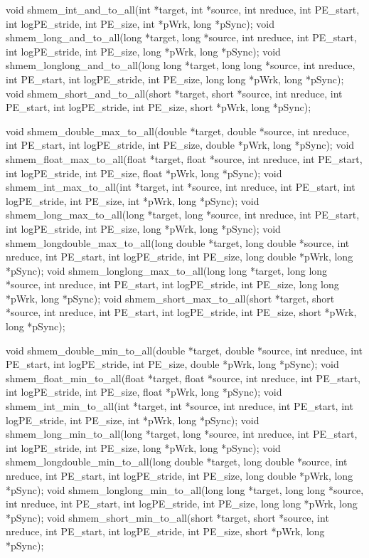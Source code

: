 
\synC %


void shmem_int_and_to_all(int *target, int *source, int nreduce, int PE_start, int logPE_stride, int PE_size, int *pWrk, long *pSync);
void shmem_long_and_to_all(long *target, long *source, int nreduce, int PE_start, int logPE_stride, int PE_size, long *pWrk, long *pSync);
void shmem_longlong_and_to_all(long long *target, long long *source, int nreduce, int PE_start, int logPE_stride, int PE_size, long long *pWrk, long *pSync);
void shmem_short_and_to_all(short *target, short *source, int nreduce, int PE_start, int logPE_stride, int PE_size, short *pWrk, long *pSync);


void shmem_double_max_to_all(double *target, double *source, int nreduce, int PE_start, int logPE_stride, int PE_size, double *pWrk, long *pSync);
void shmem_float_max_to_all(float *target, float *source, int nreduce, int PE_start, int logPE_stride, int PE_size, float *pWrk, long *pSync);
void shmem_int_max_to_all(int *target, int *source, int nreduce, int PE_start, int logPE_stride, int PE_size, int *pWrk, long *pSync);
void shmem_long_max_to_all(long *target, long *source, int nreduce, int PE_start, int logPE_stride, int PE_size, long *pWrk, long *pSync);
void shmem_longdouble_max_to_all(long double *target, long double *source, int nreduce, int PE_start, int logPE_stride, int PE_size, long double *pWrk, long *pSync);
void shmem_longlong_max_to_all(long long *target, long long *source, int nreduce, int PE_start, int logPE_stride, int PE_size, long long *pWrk, long *pSync);
void shmem_short_max_to_all(short *target, short *source, int nreduce, int PE_start, int logPE_stride, int PE_size, short *pWrk, long *pSync);


void shmem_double_min_to_all(double *target, double *source, int nreduce, int PE_start, int logPE_stride, int PE_size, double *pWrk, long *pSync);
void shmem_float_min_to_all(float *target, float *source, int nreduce, int PE_start, int logPE_stride, int PE_size, float *pWrk, long *pSync);
void shmem_int_min_to_all(int *target, int *source, int nreduce, int PE_start, int logPE_stride, int PE_size, int *pWrk, long *pSync);
void shmem_long_min_to_all(long *target, long *source, int nreduce, int PE_start, int logPE_stride, int PE_size, long *pWrk, long *pSync);
void shmem_longdouble_min_to_all(long double *target, long double *source, int nreduce, int PE_start, int logPE_stride, int PE_size, long double *pWrk, long *pSync);
void shmem_longlong_min_to_all(long long *target, long long *source, int nreduce, int PE_start, int logPE_stride, int PE_size, long long *pWrk, long *pSync);
void shmem_short_min_to_all(short *target, short *source, int nreduce, int PE_start, int logPE_stride, int PE_size, short *pWrk, long *pSync);



